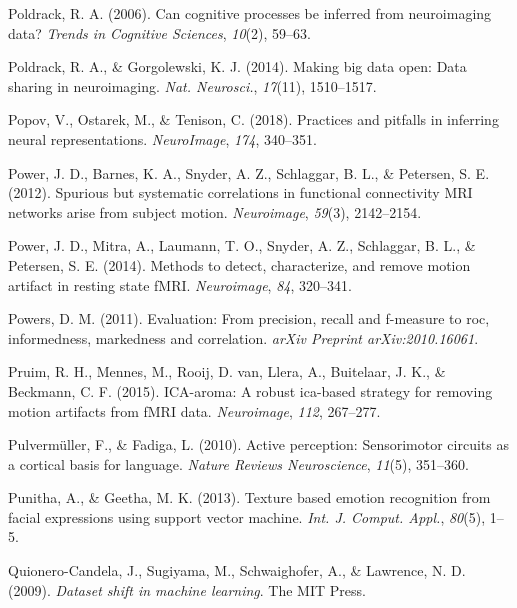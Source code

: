 \documentclass[11pt,american,a4paper,oneside,]{memoir} %
\begin{document}
\leavevmode\hypertarget{ref-poldrack2006can}{}%
Poldrack, R. A. (2006). Can cognitive processes be inferred from neuroimaging data? \emph{Trends in Cognitive Sciences}, \emph{10}(2), 59--63.

\leavevmode\hypertarget{ref-Poldrack2014-ov}{}%
Poldrack, R. A., \& Gorgolewski, K. J. (2014). Making big data open: Data sharing in neuroimaging. \emph{Nat. Neurosci.}, \emph{17}(11), 1510--1517.

\leavevmode\hypertarget{ref-popov2018practices}{}%
Popov, V., Ostarek, M., \& Tenison, C. (2018). Practices and pitfalls in inferring neural representations. \emph{NeuroImage}, \emph{174}, 340--351.

\leavevmode\hypertarget{ref-Power2012-kt}{}%
Power, J. D., Barnes, K. A., Snyder, A. Z., Schlaggar, B. L., \& Petersen, S. E. (2012). Spurious but systematic correlations in functional connectivity MRI networks arise from subject motion. \emph{Neuroimage}, \emph{59}(3), 2142--2154.

\leavevmode\hypertarget{ref-Power2014-gh}{}%
Power, J. D., Mitra, A., Laumann, T. O., Snyder, A. Z., Schlaggar, B. L., \& Petersen, S. E. (2014). Methods to detect, characterize, and remove motion artifact in resting state fMRI. \emph{Neuroimage}, \emph{84}, 320--341.

\leavevmode\hypertarget{ref-powers2020evaluation}{}%
Powers, D. M. (2011). Evaluation: From precision, recall and f-measure to roc, informedness, markedness and correlation. \emph{arXiv Preprint arXiv:2010.16061}.

\leavevmode\hypertarget{ref-pruim2015ica}{}%
Pruim, R. H., Mennes, M., Rooij, D. van, Llera, A., Buitelaar, J. K., \& Beckmann, C. F. (2015). ICA-aroma: A robust ica-based strategy for removing motion artifacts from fMRI data. \emph{Neuroimage}, \emph{112}, 267--277.

\leavevmode\hypertarget{ref-pulvermuller2010active}{}%
Pulvermüller, F., \& Fadiga, L. (2010). Active perception: Sensorimotor circuits as a cortical basis for language. \emph{Nature Reviews Neuroscience}, \emph{11}(5), 351--360.

\leavevmode\hypertarget{ref-Punitha2013-jy}{}%
Punitha, A., \& Geetha, M. K. (2013). Texture based emotion recognition from facial expressions using support vector machine. \emph{Int. J. Comput. Appl.}, \emph{80}(5), 1--5.

\leavevmode\hypertarget{ref-Quionero-Candela2009-ge}{}%
Quionero-Candela, J., Sugiyama, M., Schwaighofer, A., \& Lawrence, N. D. (2009). \emph{Dataset shift in machine learning}. The MIT Press.
\end{document}
